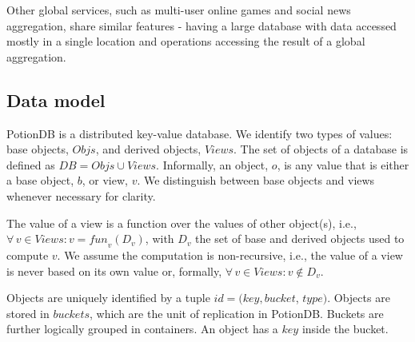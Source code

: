 \documentclass[sigplan,twocolumn,review,anonymous]{acmart}
\begin{document}
Other global services, such as multi-user online games and
social news aggregation, share similar features - having a large database with
data accessed mostly in a single location and operations accessing the result
of a global aggregation.




\subsection{Data model}
\label{subsec:datamodel}

PotionDB is a distributed key-value database.
We identify two types of values: base objects, $\mathit{Objs}$, and derived objects, $\mathit{Views}$.
The set of objects of a database is defined as $\mathit{DB} = \mathit{Objs} \cup \mathit{Views}$.
Informally, an object, $o$, is any value that is either a base object, $b$, or view, $v$.
We distinguish between base objects and views whenever necessary for clarity.

The value of a view is a function over the values of other object(s), i.e., 
$\forall\, v \in \mathit{Views} : v = \mathit{fun}_v(D_v)$, 
with $D_v$  the set of base and derived objects used to compute $v$.
We assume the computation is non-recursive, i.e., the value of a view is never based on its own value or, formally, 
$\forall\, v \in \mathit{Views} : v \notin D_v$.

Objects are uniquely identified by a tuple $\mathit{id} = \mathit{(key, bucket}$, $\mathit{type)}$.
Objects are stored in $\mathit{buckets}$, which are the unit of replication in PotionDB. 
Buckets are further logically grouped in containers. %
An object has a $\mathit{key}$ inside the bucket.
\end{document}
